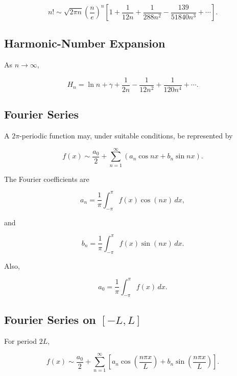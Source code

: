 \[
\boxed{
n!
\sim
\sqrt{2\pi n}
\left(
\frac{n}{e}
\right)^n
\left[
1
+
\frac{1}{12n}
+
\frac{1}{288n^2}
-
\frac{139}{51840n^3}
+\cdots
\right].
}
\]

\subsection{Harmonic-Number Expansion}
\label{subsec:harmonic-number-expansion-reference}

As \(n\to\infty\),

\[
\boxed{
H_n
=
\ln n
+
\gamma
+
\frac{1}{2n}
-
\frac{1}{12n^2}
+
\frac{1}{120n^4}
+\cdots.
}
\]

\subsection{Fourier Series}
\label{subsec:fourier-series-reference}

A \(2\pi\)-periodic function may, under suitable conditions, be represented
by

\[
\boxed{
f(x)
\sim
\frac{a_0}{2}
+
\sum_{n=1}^{\infty}
\left(
a_n\cos nx
+
b_n\sin nx
\right).
}
\]

The Fourier coefficients are

\[
\boxed{
a_n
=
\frac{1}{\pi}
\int_{-\pi}^{\pi}
f(x)\cos(nx)\,dx,
}
\]

and

\[
\boxed{
b_n
=
\frac{1}{\pi}
\int_{-\pi}^{\pi}
f(x)\sin(nx)\,dx.
}
\]

Also,

\[
\boxed{
a_0
=
\frac{1}{\pi}
\int_{-\pi}^{\pi}
f(x)\,dx.
}
\]

\subsection{Fourier Series on \([-L,L]\)}
\label{subsec:fourier-series-general-interval}

For period \(2L\),

\[
\boxed{
f(x)
\sim
\frac{a_0}{2}
+
\sum_{n=1}^{\infty}
\left[
a_n
\cos\left(
\frac{n\pi x}{L}
\right)
+
b_n
\sin\left(
\frac{n\pi x}{L}
\right)
\right].
}
\]

